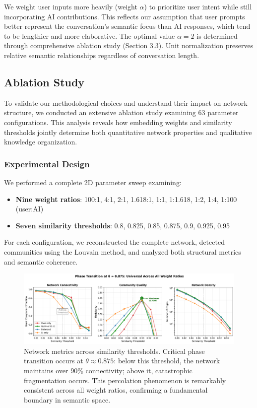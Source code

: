 \documentclass{svproc}
\begin{document}
We weight user inputs more heavily (weight $\alpha$) to prioritize user intent while still incorporating AI contributions. This reflects our assumption that user prompts better represent the conversation's semantic focus than AI responses, which tend to be lengthier and more elaborative. The optimal value $\alpha = 2$ is determined through comprehensive ablation study (Section 3.3). Unit normalization preserves relative semantic relationships regardless of conversation length.

\subsection{Ablation Study}

To validate our methodological choices and understand their impact on network structure, we conducted an extensive ablation study examining 63 parameter configurations. This analysis reveals how embedding weights and similarity thresholds jointly determine both quantitative network properties and qualitative knowledge organization.

\subsubsection{Experimental Design}

We performed a complete 2D parameter sweep examining:
\begin{itemize}
    \item \textbf{Nine weight ratios}: 100:1, 4:1, 2:1, 1.618:1, 1:1, 1:1.618, 1:2, 1:4, 1:100 (user:AI)
    \item \textbf{Seven similarity thresholds}: 0.8, 0.825, 0.85, 0.875, 0.9, 0.925, 0.95
\end{itemize}

For each configuration, we reconstructed the complete network, detected communities using the Louvain method, and analyzed both structural metrics and semantic coherence.

\begin{figure}[h]
\centering
\includegraphics[width=\textwidth]{./images/threshold_evolution_clean.png}
\caption{Network metrics across similarity thresholds. Critical phase transition occurs at $\theta \approx 0.875$: below this threshold, the network maintains over 90\% connectivity; above it, catastrophic fragmentation occurs. This percolation phenomenon is remarkably consistent across all weight ratios, confirming a fundamental boundary in semantic space.}
\label{fig:phase_transition}
\end{figure}
\end{document}
